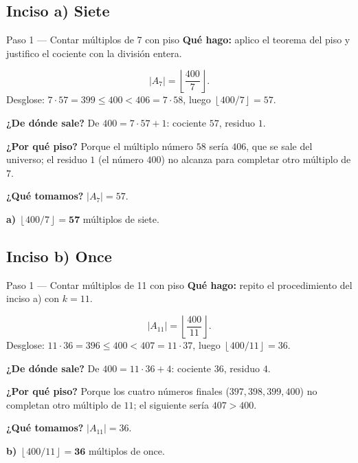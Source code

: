 \documentclass[11pt]{article}
\begin{document}
\subsection*{Inciso a) Siete}

\begin{paso}{Paso 1 --- Contar múltiplos de 7 con piso}
\textbf{Qué hago:} aplico el teorema del piso y justifico el cociente con la división entera.

\[
|A_7| = \left\lfloor \frac{400}{7}\right\rfloor .
\]
Desglose: $7\cdot 57 = 399 \le 400 < 406 = 7\cdot 58$, luego $\left\lfloor 400/7\right\rfloor = 57$.

\textbf{¿De dónde sale?} De $400 = 7\cdot 57 + 1$: cociente $57$, residuo $1$.

\textbf{¿Por qué piso?} Porque el múltiplo número $58$ sería $406$, que se sale del universo; el residuo $1$ (el número $400$) no alcanza para completar otro múltiplo de $7$.

\textbf{¿Qué tomamos?} $|A_7|=57$.
\end{paso}

\begin{resp}
\textbf{a)} $\left\lfloor 400/7\right\rfloor = \mathbf{57}$ múltiplos de siete.
\end{resp}

\subsection*{Inciso b) Once}

\begin{paso}{Paso 1 --- Contar múltiplos de 11 con piso}
\textbf{Qué hago:} repito el procedimiento del inciso a) con $k=11$.

\[
|A_{11}| = \left\lfloor \frac{400}{11}\right\rfloor .
\]
Desglose: $11\cdot 36 = 396\le 400 < 407 = 11\cdot 37$, luego $\left\lfloor 400/11\right\rfloor = 36$.

\textbf{¿De dónde sale?} De $400 = 11\cdot 36 + 4$: cociente $36$, residuo $4$.

\textbf{¿Por qué piso?} Porque los cuatro números finales ($397,398,399,400$) no completan otro múltiplo de $11$; el siguiente sería $407>400$.

\textbf{¿Qué tomamos?} $|A_{11}|=36$.
\end{paso}

\begin{resp}
\textbf{b)} $\left\lfloor 400/11\right\rfloor = \mathbf{36}$ múltiplos de once.
\end{resp}
\end{document}
